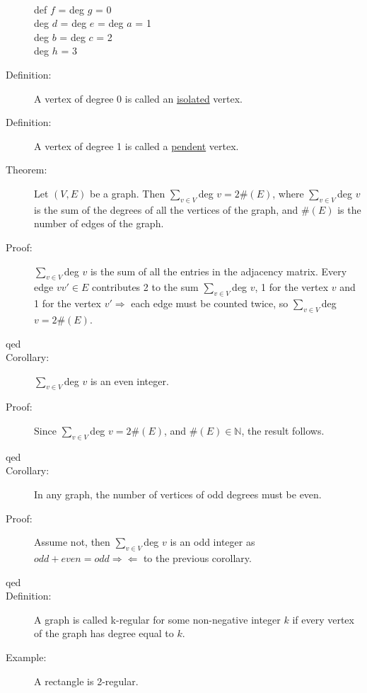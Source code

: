 \documentclass[10pt]{article}
\begin{document}
\begin{description}
\begin{figure}[h!]
		\end{figure}
		~\\
		def $f$ = deg $g$ = 0 \\
		deg $d$ = deg $e$ = deg $a$ = 1 \\
		deg $b$ = deg $c$ = 2 \\
		deg $h$ = 3 \\
		\item[Definition:] A vertex of degree 0 is called an \underline{isolated} vertex.
		\item[Definition:] A vertex of degree 1 is called a \underline{pendent} vertex.
		\item[Theorem:] Let $(V, E)$ be a graph. Then $\sum_{v \in V}$deg $v = 2\#(E)$, where $\sum_{v \in V}$deg $v$ is the sum of the degrees of all the vertices of the graph, and $\#(E)$ is the number of edges of the graph.
		\item[Proof:] $\sum_{v \in V}$deg $v$ is the sum of all the entries in the adjacency matrix. Every edge $vv' \in E$ contributes 2 to the sum $\sum_{v \in V}$deg $v$, 1 for the vertex $v$ and 1 for the vertex $v' \Rightarrow$ each edge must be counted twice, so $\sum_{v \in V}$deg $v = 2 \#(E)$.
		\item[qed]
		\item[Corollary:] $\sum_{v \in V}$deg $v$ is an even integer.
		\item[Proof:] Since $\sum_{v \in V}$deg $v = 2 \#(E)$, and $\#(E) \in \mathbb{N}$, the result follows.
		\item[qed]
		\item[Corollary:] In any graph, the number of vertices of odd degrees must be even.
		\item[Proof:] Assume not, then $\sum_{v \in V}$deg $v$ is an odd integer as $odd + even = odd \Rightarrow \Leftarrow$ to the previous corollary.
		\item[qed]
		\item[Definition:] A graph is called k-regular for some non-negative integer $k$ if every vertex of the graph has degree equal to $k$.
		\item[Example:] A rectangle is 2-regular. \\
		\begin{figure}[h!]
			\centering
\end{figure}
\end{description}
\end{document}
